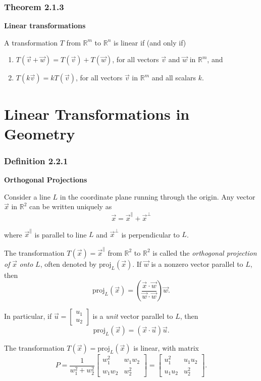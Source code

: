 \documentclass{report}
\begin{document}
\subsubsection*{Theorem 2.1.3}
\par\noindent\textbf{Linear transformations}
\par\noindent A transformation $T$ from $\mathbb{R}^{m}$ to $\mathbb{R}^{n}$ is linear if (and only if)
\renewcommand{\labelenumi}{\textbf{\alph{enumi}.}}
\begin{enumerate}
\item $T(\vec{v}+\vec{w})=T(\vec{v})+T(\vec{w})$, for all vectors $\vec{v}$ and $\vec{w}$ in $\mathbb{R}^{m}$, and
\item $T(k\vec{v})=kT(\vec{v})$, for all vectors $\vec{v}$ in $\mathbb{R}^{m}$ and all scalars $k$.
\end{enumerate}
\pagebreak

\section{Linear Transformations in Geometry}
\subsubsection*{Definition 2.2.1}
\par\noindent\textbf{Orthogonal Projections}
\par\noindent Consider a line $L$ in the coordinate plane running through the origin. Any vector $\vec{x}$ in $\mathbb{R}^{2}$ can be written uniquely as
\[\vec{x}=\vec{x}^{\parallel}+\vec{x}^{\bot}\]
\par\noindent where $\vec{x}^{\parallel}$ is parallel to line $L$ and $\vec{x}^{\bot}$ is perpendicular to $L$.
\par\noindent The transformation $T(\vec{x})=\vec{x}^{\parallel}$ from $\mathbb{R}^{2}$ to $\mathbb{R}^{2}$ is called the \textit{orthogonal projection of} $\vec{x}$ \textit{onto} $L$, often denoted by $\textrm{proj}_{L}(\vec{x})$. If $\vec{w}$ is a nonzero vector parallel to $L$, then
\[\textrm{proj}_{L}(\vec{x})=\left(\frac{\vec{x}\cdot\vec{w}}{\vec{w}\cdot\vec{w}}\right)\vec{w}.\]
\par\noindent In particular, if $\vec{u}=\left[\begin{array}{c}u_{1}\\ u_{2}\end{array}\right]$ is a \textit{unit} vector parallel to $L$, then
\[\textrm{proj}_{L}(\vec{x})=(\vec{x}\cdot\vec{u})\vec{u}.\]
\par\noindent The transformation $T(\vec{x})=\textrm{proj}_{L}(\vec{x})$ is linear, with matrix
\[P=\frac{1}{w_{1}^{2}+w_{2}^{2}}\left[\begin{array}{cc}w_{1}^{2}&w_{1}w_{2}\\ w_{1}w_{2}&w_{2}^{2}\end{array}\right]=\left[\begin{array}{cc}u_{1}^{2}&u_{1}u_{2}\\ u_{1}u_{2}&u_{2}^{2}\end{array}\right].\]
\end{document}
